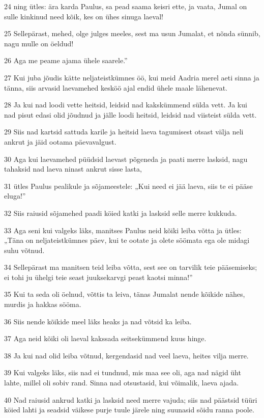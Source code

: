 \par 24 ning ütles: ära karda Paulus, sa pead saama keisri ette, ja vaata, Jumal on sulle kinkinud need kõik, kes on ühes sinuga laeval!
\par 25 Sellepärast, mehed, olge julges meeles, sest ma usun Jumalat, et nõnda sünnib, nagu mulle on öeldud!
\par 26 Aga me peame ajama ühele saarele.”
\par 27 Kui juba jõudis kätte neljateistkümnes öö, kui meid Aadria merel aeti sinna ja tänna, siis arvasid laevamehed kesköö ajal endid ühele maale lähenevat.
\par 28 Ja kui nad loodi vette heitsid, leidsid nad kakskümmend sülda vett. Ja kui nad pisut edasi olid jõudnud ja jälle loodi heitsid, leidsid nad viisteist sülda vett.
\par 29 Siis nad kartsid sattuda karile ja heitsid laeva tagumisest otsast välja neli ankrut ja jäid ootama päevavalgust.
\par 30 Aga kui laevamehed püüdsid laevast põgeneda ja paati merre lasksid, nagu tahaksid nad laeva ninast ankrut sisse lasta,
\par 31 ütles Paulus pealikule ja sõjameestele: „Kui need ei jää laeva, siis te ei pääse eluga!”
\par 32 Siis raiusid sõjamehed paadi köied katki ja lasksid selle merre kukkuda.
\par 33 Aga seni kui valgeks läks, manitses Paulus neid kõiki leiba võtta ja ütles: „Täna on neljateistkümnes päev, kui te ootate ja olete söömata ega ole midagi suhu võtnud.
\par 34 Sellepärast ma manitsen teid leiba võtta, sest see on tarvilik teie pääsemiseks; ei tohi ju ühelgi teie seast juuksekarvgi peast kaotsi minna!”
\par 35 Kui ta seda oli öelnud, võttis ta leiva, tänas Jumalat nende kõikide nähes, murdis ja hakkas sööma.
\par 36 Siis nende kõikide meel läks heaks ja nad võtsid ka leiba.
\par 37 Aga neid kõiki oli laeval kakssada seitsekümmend kuus hinge.
\par 38 Ja kui nad olid leiba võtnud, kergendasid nad veel laeva, heites vilja merre.
\par 39 Kui valgeks läks, siis nad ei tundnud, mis maa see oli, aga nad nägid üht lahte, millel oli sobiv rand. Sinna nad otsustasid, kui võimalik, laeva ajada.
\par 40 Nad raiusid ankrud katki ja lasksid need merre vajuda; siis nad päästsid tüüri köied lahti ja seadsid väikese purje tuule järele ning suunasid sõidu ranna poole.
